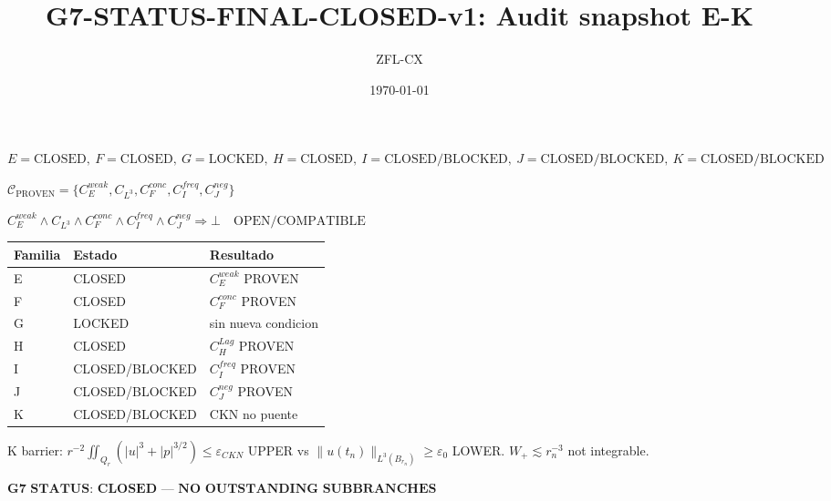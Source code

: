 \documentclass[11pt]{article}
\begin{document}
\title{G7-STATUS-FINAL-CLOSED-v1: Audit snapshot E-K}\author{ZFL-CX}\date{\today}\maketitle
\begin{center}
$\boxed{E=\mathrm{CLOSED},\ F=\mathrm{CLOSED},\ G=\mathrm{LOCKED},\ H=\mathrm{CLOSED},\ I=\mathrm{CLOSED/BLOCKED},\ J=\mathrm{CLOSED/BLOCKED},\ K=\mathrm{CLOSED/BLOCKED}}$
\end{center}
\begin{center}
$\boxed{\mathcal C_{\mathrm{PROVEN}}=\{C_E^{weak},C_{L^3},C_F^{conc},C_I^{freq},C_J^{neg}\}}$
\end{center}
\begin{center}
$\boxed{C_E^{weak}\land C_{L^3}\land C_F^{conc}\land C_I^{freq}\land C_J^{neg}\Rightarrow\bot\quad\text{OPEN/COMPATIBLE}}$
\end{center}
\begin{center}
\begin{tabular}{|l|l|l|}\hline
Familia & Estado & Resultado \\ \hline
E & CLOSED & $C_E^{weak}$ PROVEN \\ \hline
F & CLOSED & $C_F^{conc}$ PROVEN \\ \hline
G & LOCKED & sin nueva condicion \\ \hline
H & CLOSED & $C_H^{Lag}$ PROVEN \\ \hline
I & CLOSED/BLOCKED & $C_I^{freq}$ PROVEN \\ \hline
J & CLOSED/BLOCKED & $C_J^{neg}$ PROVEN \\ \hline
K & CLOSED/BLOCKED & CKN no puente \\ \hline
\end{tabular}
\end{center}
K barrier: $\displaystyle r^{-2}\iint_{Q_r}(|u|^3+|p|^{3/2})\le\varepsilon_{CKN}$ UPPER vs $\|u(t_n)\|_{L^3(B_{r_n})}\ge\varepsilon_0$ LOWER. $W_+\lesssim r_n^{-3}$ not integrable.
\begin{center}
$\boxed{\textbf{G7 STATUS: CLOSED — NO OUTSTANDING SUBBRANCHES}}$
\end{center}
\end{document}
